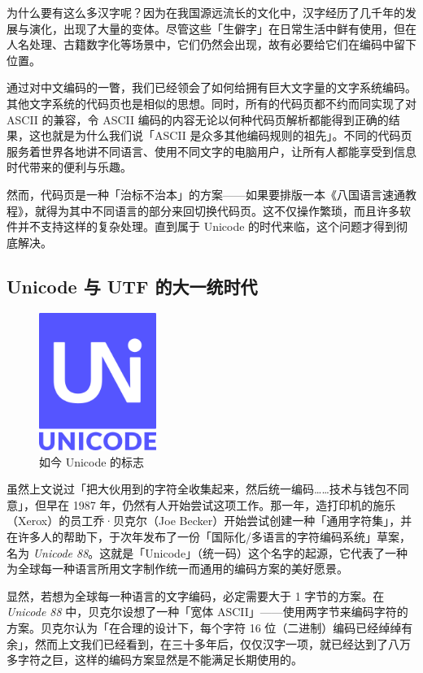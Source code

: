 \begin{note}
  为什么要有这么多汉字呢？因为在我国源远流长的文化中，汉字经历了几千年的发展与演化，出现了大量的变体。尽管这些「生僻字」在日常生活中鲜有使用，但在人名处理、古籍数字化等场景中，它们仍然会出现，故有必要给它们在编码中留下位置。
\end{note}

通过对中文编码的一瞥，我们已经领会了如何给拥有巨大文字量的文字系统编码。其他文字系统的代码页也是相似的思想。同时，所有的代码页都不约而同实现了对 ASCII 的兼容，令 ASCII 编码的内容无论以何种代码页解析都能得到正确的结果，这也就是为什么我们说「ASCII 是众多其他编码规则的祖先」。不同的代码页服务着世界各地讲不同语言、使用不同文字的电脑用户，让所有人都能享受到信息时代带来的便利与乐趣。

然而，代码页是一种「治标不治本」的方案——如果要排版一本《八国语言速通教程》，就得为其中不同语言的部分来回切换代码页。这不仅操作繁琐，而且许多软件并不支持这样的复杂处理。直到属于 Unicode 的时代来临，这个问题才得到彻底解决。

\subsection{Unicode 与 UTF 的大一统时代}

\begin{figure}
  \centering
  \vspace*{-.5cm}
  \includegraphics[width=3.8cm]{assets/advanced/UnicodeLogo.png}
  \caption{如今 Unicode 的标志}
  \label{fig:UnicodeLogo}
\end{figure}

虽然上文说过「把大伙用到的字符全收集起来，然后统一编码……技术与钱包不同意」，但早在 1987 年，仍然有人开始尝试这项工作。那一年，造打印机的施乐（Xerox）的员工乔·贝克尔（Joe Becker）开始尝试创建一种「通用字符集」，并在许多人的帮助下，于次年发布了一份「国际化/多语言的字符编码系统」草案，名为 \textit{Unicode 88}。这就是「Unicode」（统一码）这个名字的起源，它代表了一种为全球每一种语言所用文字制作统一而通用的编码方案的美好愿景。

显然，若想为全球每一种语言的文字编码，必定需要大于 1 字节的方案。在 \textit{Unicode 88} 中，贝克尔设想了一种「宽体 ASCII」——使用两字节来编码字符的方案。贝克尔认为「在合理的设计下，每个字符 16 位（二进制）编码已经绰绰有余」，然而上文我们已经看到，在三十多年后，仅仅汉字一项，就已经达到了八万多字符之巨，这样的编码方案显然是不能满足长期使用的。

